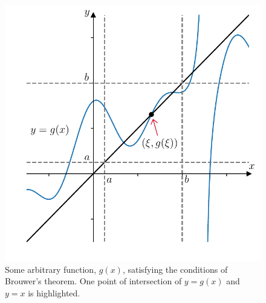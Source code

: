 \begin{figure}[H]
	\begin{center}
	\includegraphics[width=0.7\linewidth]{figures/ch2_brouwer.pdf} 
	  \caption{Some arbitrary function, $g(x)$, satisfying the conditions of Brouwer's theorem. One point of intersection of $y=g(x)$ and $y=x$ is highlighted.} \label{fig:ch2_brouwer}
	\end{center}
\end{figure}

